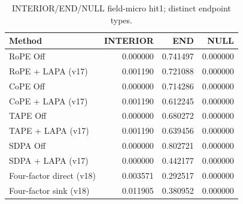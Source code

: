 \begin{table}[t]
\centering
\scriptsize
\caption{INTERIOR/END/NULL field-micro hit1; distinct endpoint types.}
\begin{tabular}{lrrr}
\toprule
Method & INTERIOR & END & NULL \\
\midrule
RoPE Off & 0.000000 & 0.741497 & 0.000000 \\
RoPE + LAPA (v17) & 0.001190 & 0.721088 & 0.000000 \\
CoPE Off & 0.000000 & 0.714286 & 0.000000 \\
CoPE + LAPA (v17) & 0.001190 & 0.612245 & 0.000000 \\
TAPE Off & 0.000000 & 0.680272 & 0.000000 \\
TAPE + LAPA (v17) & 0.001190 & 0.639456 & 0.000000 \\
SDPA Off & 0.000000 & 0.802721 & 0.000000 \\
SDPA + LAPA (v17) & 0.000000 & 0.442177 & 0.000000 \\
Four-factor direct (v18) & 0.003571 & 0.292517 & 0.000000 \\
Four-factor sink (v18) & 0.011905 & 0.380952 & 0.000000 \\
\bottomrule
\end{tabular}
\end{table}
